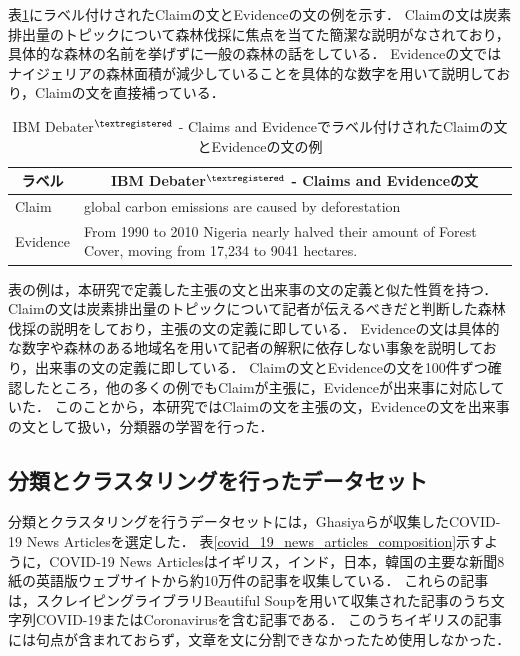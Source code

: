 \documentclass[12pt,a4j]{jreport}
\begin{document}
表\ref{claim_evidence_example}にラベル付けされたClaimの文とEvidenceの文の例を示す．
Claimの文は炭素排出量のトピックについて森林伐採に焦点を当てた簡潔な説明がなされており，具体的な森林の名前を挙げずに一般の森林の話をしている．
Evidenceの文ではナイジェリアの森林面積が減少していることを具体的な数字を用いて説明しており，Claimの文を直接補っている．

\begin{table}[H]
  \caption{IBM Debater$^{\textregistered}$ - Claims and Evidenceでラベル付けされたClaimの文とEvidenceの文の例}
  \vspace{4mm}
  \centering
  \begin{tabular}{lp{12.3cm}}
    \hline
    \multicolumn{1}{c}{ラベル} & \multicolumn{1}{c}{IBM Debater$^{\textregistered}$ - Claims and Evidenceの文}
    \\
    \hline
    Claim & global carbon emissions are caused by deforestation
    \\
    Evidence & \baselineskip=16pt
    From 1990 to 2010 Nigeria nearly halved their amount of Forest Cover, moving from 17,234 to 9041 hectares.
    \\[0.5mm]
    \hline
  \end{tabular}
  \label{claim_evidence_example}
\end{table}

表の例は，本研究で定義した主張の文と出来事の文の定義と似た性質を持つ．
Claimの文は炭素排出量のトピックについて記者が伝えるべきだと判断した森林伐採の説明をしており，主張の文の定義に即している．
Evidenceの文は具体的な数字や森林のある地域名を用いて記者の解釈に依存しない事象を説明しており，出来事の文の定義に即している．
Claimの文とEvidenceの文を100件ずつ確認したところ，他の多くの例でもClaimが主張に，Evidenceが出来事に対応していた．
このことから，本研究ではClaimの文を主張の文，Evidenceの文を出来事の文として扱い，分類器の学習を行った．


\subsection{分類とクラスタリングを行ったデータセット}
分類とクラスタリングを行うデータセットには，Ghasiyaらが収集したCOVID-19 News Articlesを選定した\textcolor{red}{\cite{ghasiya_investigating_2021}}．
表\ref{covid_19_news_articles_composition}示すように，COVID-19 News Articlesはイギリス，インド，日本，韓国の主要な新聞8紙の英語版ウェブサイトから約10万件の記事を収集している．
これらの記事は，スクレイピングライブラリBeautiful Soupを用いて収集された記事のうち文字列COVID-19またはCoronavirusを含む記事である．
このうちイギリスの記事には句点が含まれておらず，文章を文に分割できなかったため使用しなかった．
\end{document}
